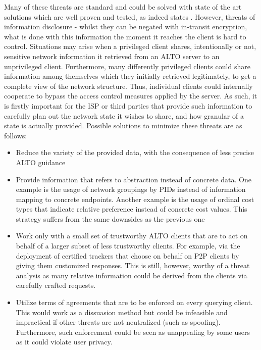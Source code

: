     Many of these threats are standard and could be solved with state of the art solutions which are well proven and tested, as indeed states \cite{alto-protocol}.
    However, threats of information disclosure - whilst they can be negated with in-transit encryption, what is done with this information the moment it reaches the client is hard to control.
    Situations may arise when a privileged client shares, intentionally or not, sensitive network information it retrieved from an ALTO server to an unprivileged client.
    Furthermore, many differently privileged clients could share information among themselves which they initially retrieved legitimately, to get a complete view of the network structure. Thus, individual clients could internally cooperate to bypass the access control measures applied by the server.
    As such, it is firstly important for the ISP or third parties that provide such information to carefully plan out the network state it wishes to share, and how granular of a state is actually provided.
    Possible solutions to minimize these threats are as follows:

\begin{itemize}
    \item Reduce the variety of the provided data, with the consequence of less precise ALTO guidance
    \item Provide information that refers to abstraction instead of concrete data.
        One example is the usage of network groupings by PIDs instead of information mapping to concrete endpoints.
        Another example is the usage of ordinal cost types that indicate relative preference instead of concrete cost values.
        This strategy suffers from the same downsides as the previous one
    \item Work only with a small set of trustworthy ALTO clients that are to act on behalf of a larger subset of less trustworthy clients.
        For example, via the deployment of certified trackers that choose on behalf on P2P clients by giving them customized responses.
        This is still, however, worthy of a threat analysis as many relative information could be derived from the clients via carefully crafted requests.
    \item Utilize terms of agreements that are to be enforced on every querying client.
        This would work as a dissuasion method but could be infeasible and impractical if other threats are not neutralized (such as spoofing).
        Furthermore, such enforcement could be seen as unappealing by some users as it could violate user privacy.
\end{itemize}

